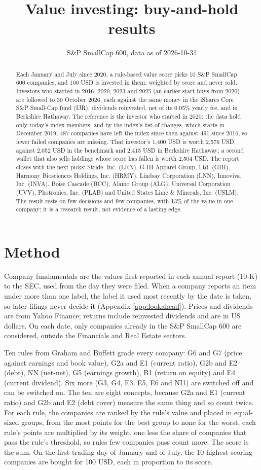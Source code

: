 \documentclass[11pt,a4paper]{article}
\title{Value investing: buy-and-hold results}
\author{S\&P SmallCap 600, data as of 2026-10-31}
\date{}
\begin{document}
\maketitle
\begin{abstract}
Each January and July since 2020, a rule-based value score picks 10 S\&P SmallCap 600 companies, and 100 USD is invested in them, weighted by score and never sold. Investors who started in 2016, 2020, 2023 and 2025 (an earlier start buys from 2020) are followed to 30 October 2026, each against the same money in the iShares Core S\&P Small-Cap fund (IJR), dividends reinvested, net of its 0.05\% yearly fee, and in Berkshire Hathaway. The reference is the investor who started in 2020: the data hold only today's index members, and by the index's list of changes, which starts in December 2019, 487 companies have left the index since then against 491 since 2016, so fewer failed companies are missing. That investor's 1,400 USD is worth 2,576 USD, against 2,052 USD in the benchmark and 2,415 USD in Berkshire Hathaway; a second wallet that also sells holdings whose score has fallen is worth 2,504 USD. The report closes with the next picks: Stride, Inc. (LRN), G-III Apparel Group, Ltd. (GIII), Harmony Biosciences Holdings, Inc. (HRMY), Lindsay Corporation (LNN), Innoviva, Inc. (INVA), Boise Cascade (BCC), Alamo Group (ALG), Universal Corporation (UVV), Photronics, Inc. (PLAB) and United States Lime \& Minerals, Inc. (USLM). The result rests on few decisions and few companies, with 13\% of the value in one company; it is a research result, not evidence of a lasting edge.
\end{abstract}
\section{Method}
Company fundamentals are the values first reported in each annual report (10-K) to the SEC, used from the day they were filed. When a company reports an item under more than one label, the label it used most recently by the date is taken, so later filings never decide it (Appendix \ref{app:lookahead}). Prices and dividends are from Yahoo Finance; returns include reinvested dividends and are in US dollars. On each date, only companies already in the S\&P SmallCap 600 are considered, outside the Financials and Real Estate sectors.

Ten rules from Graham and Buffett grade every company: G6 and G7 (price against earnings and book value), G2a and E1 (current ratio), G2b and E2 (debt), NN (net-net), G5 (earnings growth), B1 (return on equity) and E4 (current dividend). Six more (G3, G4, E3, E5, E6 and NI1) are switched off and can be switched on. The ten are eight concepts, because G2a and E1 (current ratio) and G2b and E2 (debt cover) measure the same thing and so count twice. For each rule, the companies are ranked by the rule's value and placed in equal-sized groups, from the most points for the best group to none for the worst; each rule's points are multiplied by its weight, one less the share of companies that pass the rule's threshold, so rules few companies pass count more. The score is the sum. On the first trading day of January and of July, the 10 highest-scoring companies are bought for 100 USD, each in proportion to its score.
\end{document}
